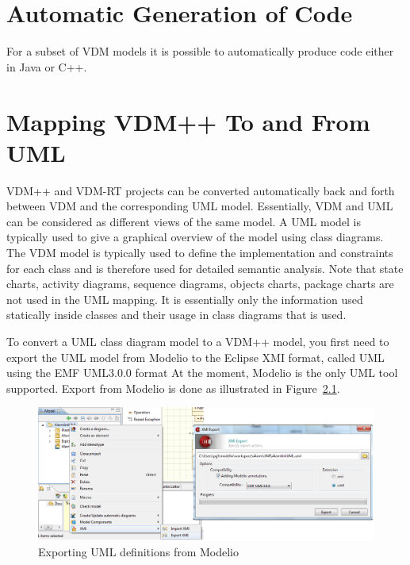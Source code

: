 \documentclass{overturerepchap}
\begin{document}
\chapter{Automatic Generation of Code}\label{sec:codegen}

For a subset of VDM models it is possible to automatically produce code either in Java or C++.

\chapter{Mapping VDM++ To and From UML}\label{sec:vdmuml}

VDM++ and VDM-RT projects can be converted automatically back and forth between
VDM and the corresponding UML model.  Essentially, VDM and UML can be
considered as different views of the same model. A UML model is typically used
to give a graphical overview of the model using class diagrams.  The VDM model
is typically used to define the implementation and constraints for each class
and is therefore used for detailed semantic analysis. Note that state charts,
activity diagrams, sequence diagrams, objects charts, package charts are not
used in the UML mapping. It is essentially only the information
used statically inside classes and their usage in class diagrams that is used.

To convert a UML class diagram model to a VDM++ model, you first need to export
the UML model from Modelio to the Eclipse XMI format, called UML
using the EMF UML3.0.0 format At the moment, Modelio is the only
UML tool supported. Export from Modelio is done as illustrated in
Figure~\ref{fig:exportfromUML}.

\begin{figure}[htbp]
\begin{center}
\includegraphics[width=4.5in]{screenDumps/xmiexportmodelio}
\caption{Exporting UML definitions from Modelio\label{fig:exportfromUML}}
\end{center}
\end{figure}
\end{document}
